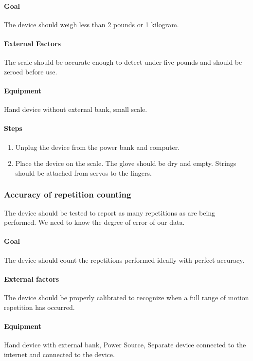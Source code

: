 \documentclass{article}
\begin{document}
\paragraph{Goal} The device should weigh less than 2 pounds or 1 kilogram.

\paragraph{External Factors} The scale should be accurate enough to detect under five pounds and should be zeroed before use.

\paragraph{Equipment} Hand device without external bank, small scale.

\paragraph{Steps}
\begin{enumerate}
\item Unplug the device from the power bank and computer.
\item Place the device on the scale. The glove should be dry and empty. Strings should be attached from servos to the fingers.
\end{enumerate}

\subsubsection{Accuracy of repetition counting}
The device should be tested to report as many repetitions as are being performed. We need to know the degree of error of our data.

\paragraph{Goal} The device should count the repetitions performed ideally with perfect accuracy.

\paragraph{External factors} The device should be properly calibrated to recognize when a full range of motion repetition has occurred.

\paragraph{Equipment} Hand device with external bank, Power Source, Separate device connected to the internet and connected to the device.
\end{document}
